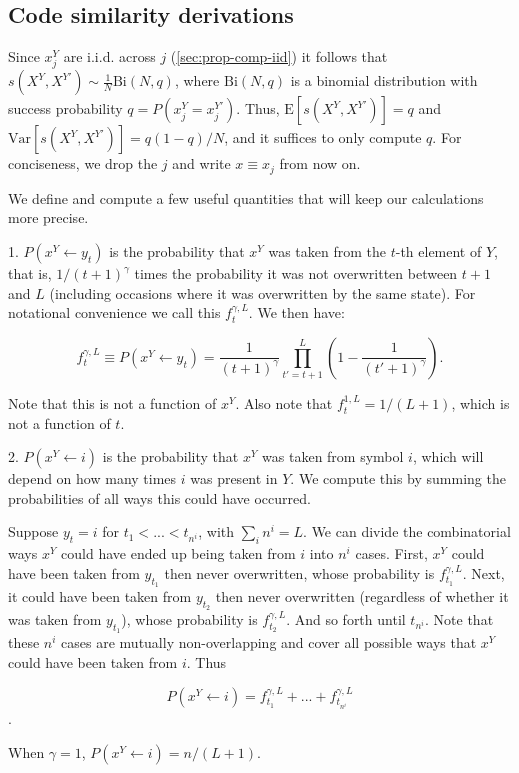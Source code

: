 \documentclass{article}
\begin{document}
\subsection{Code similarity derivations}

Since $x^Y_j$ are i.i.d. across $j$ (\ref{sec:prop-comp-iid}) it follows that $s(X^Y, X^{Y'}) \sim \frac{1}{N}\textrm{Bi}(N, q)$, where $\textrm{Bi}(N, q)$ is a binomial distribution with success probability $q = P(x^Y_j = x^{Y'}_j)$. Thus, $\textrm{E}[s(X^Y, X^{Y'})] = q$ and $\textrm{Var}[s(X^Y, X^{Y'})] = q(1-q)/N$, and it suffices to only compute $q$. For conciseness, we drop the $j$ and write $x \equiv x_j$ from now on.

We define and compute a few useful quantities that will keep our calculations more precise.

1. $P(x^Y \leftarrow y_t)$ is the probability that $x^Y$ was taken from the $t$-th element of $Y$, that is, $1/(t+1)^\gamma$ times the probability it was not overwritten between $t+1$ and $L$ (including occasions where it was overwritten by the same state). For notational convenience we call this $f^{\gamma,L}_t$. We then have:

$$f^{\gamma,L}_t \equiv P(x^Y \leftarrow y_t) = \frac{1}{(t+1)^\gamma}\prod\limits_{t' = t+1}^L\left(1 - \frac{1}{(t'+1)^\gamma}\right).$$

Note that this is not a function of $x^Y$. Also note that $f^{1,L}_t = 1/(L+1)$, which is not a function of $t$.

2. $P(x^Y \leftarrow i)$ is the probability that $x^Y$ was taken from symbol $i$, which will depend on how many times $i$ was present in $Y$. We compute this by summing the probabilities of all ways this could have occurred.

Suppose $y_t = i$ for $t_1 < ... < t_{n^i}$, with $\sum_i n^i = L$. We can divide the combinatorial ways $x^Y$ could have ended up being taken from $i$ into $n^i$ cases. First, $x^Y$ could have been taken from $y_{t_1}$ then never overwritten, whose probability is $f^{\gamma,L}_{t_1}$. Next, it could have been taken from $y_{t_2}$ then never overwritten (regardless of whether it was taken from $y_{t_1}$), whose probability is $f^{\gamma,L}_{t_2}$. And so forth until $t_{n^i}$. Note that these $n^i$ cases are mutually non-overlapping and cover all possible ways that $x^Y$ could have been taken from $i$. Thus

$$P(x^Y \leftarrow i) = f^{\gamma,L}_{t_1} + ... + f^{\gamma,L}_{t_{n^i}}$$.

When $\gamma = 1$, $P(x^Y \leftarrow i) = n/(L+1)$.
\end{document}

